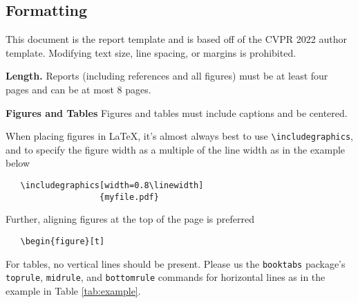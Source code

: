 \documentclass[10pt,twocolumn,letterpaper]{article}
\newcommand{\xhdr}[1]{\vspace{3pt}\noindent\textbf{#1}}
\begin{document}

\subsection{Formatting}
This document is the report template and is based off of the CVPR 2022 author template. Modifying text size, line spacing, or margins is prohibited. 

\xhdr{Length.} Reports (including references and all figures) must be at least four pages and can be at most 8 pages. 




\xhdr{Figures and Tables} Figures and tables must include captions and be centered. 

When placing figures in \LaTeX, it's almost always best to use \verb+\includegraphics+, and to specify the figure width as a multiple of the line width as in the example below
{\small\begin{verbatim}
   \includegraphics[width=0.8\linewidth]
                   {myfile.pdf}
\end{verbatim}
}
\noindent Further, aligning figures at the top of the page is preferred {\small\begin{verbatim}
   \begin{figure}[t]
\end{verbatim}
}


For tables, no vertical lines should be present. Please us the \texttt{booktabs} package's \texttt{toprule}, \texttt{midrule}, and \texttt{bottomrule} commands for horizontal lines as in the example in Table \ref{tab:example}.
\end{document}
